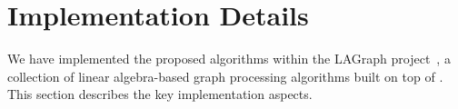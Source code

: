 \section{Implementation Details} \label{sec:implementation}

We have implemented the proposed algorithms within the LAGraph project~\cite{lagraph}, a collection of linear algebra-based graph processing algorithms built on top of \ssgrb \cite{10.1145/3577195}. This section describes the key implementation aspects.

%
%
%
%
%
%
%
%
